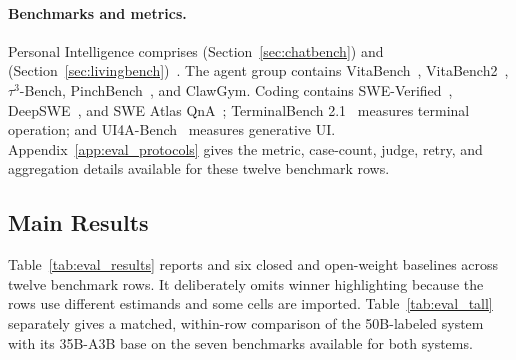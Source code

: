 \paragraph{Benchmarks and metrics.}
Personal Intelligence comprises \chatbench{} (Section~\ref{sec:chatbench}) and \livingbench{} (Section~\ref{sec:livingbench})~\citep{macaron_v1_blog2026,macaron_v1_preview2026}. The agent group contains VitaBench~\citep{vitabench2026}, VitaBench2~\citep{chen2026vitabench2}, $\tau^3$-Bench, PinchBench~\citep{pinchbench2026}, and ClawGym. Coding contains SWE-Verified~\citep{jimenez2024swebench}, DeepSWE~\citep{deepswe2026}, and SWE Atlas QnA~\citep{sweatlas2026}; TerminalBench 2.1~\citep{terminalbench2026} measures terminal operation; and UI4A-Bench~\citep{ui4abench2026} measures generative UI. Appendix~\ref{app:eval_protocols} gives the metric, case-count, judge, retry, and aggregation details available for these twelve benchmark rows.

\subsection{Main Results}
\label{sec:results_main}

Table~\ref{tab:eval_results} reports \venti{} and six closed and open-weight baselines across twelve benchmark rows. It deliberately omits winner highlighting because the rows use different estimands and some cells are imported. Table~\ref{tab:eval_tall} separately gives a matched, within-row comparison of the 50B-labeled \tall{} system with its 35B-A3B base on the seven benchmarks available for both systems.

